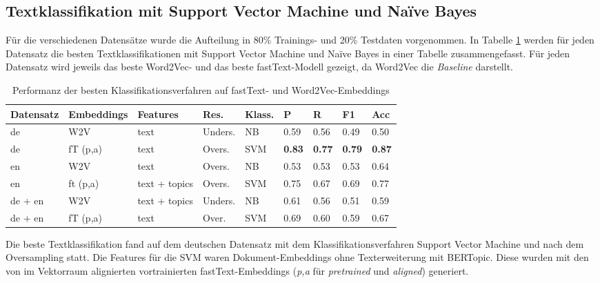\documentclass[ngerman]{ttlab-qualify}
\begin{document}
\subsection{Textklassifikation mit Support Vector Machine und Naïve Bayes}
Für die verschiedenen Datensätze wurde die Aufteilung in 80\% Trainings- und 20\% Testdaten vorgenommen. 
In Tabelle \ref{best_ML} werden für jeden Datensatz die besten Textklassifikationen mit Support Vector Machine und Naïve Bayes in einer Tabelle zusammengefasst. Für jeden Datensatz wird jeweils das beste Word2Vec- und das beste fastText-Modell gezeigt, da Word2Vec die \textit{Baseline} darstellt. 
\begin{table}[!ht]
    \centering
    \caption{Performanz der besten Klassifikationsverfahren auf fastText- und Word2Vec-Embeddings} \label{best_ML}
    \begin{tabular}{|l|l|l|l|l|l|l|l|l|}
    \hline
        \textbf{Datensatz} & \textbf{Embeddings} & \textbf{Features} & \textbf{Res.} & \textbf{Klass.} & \textbf{P} & \textbf{R} & \textbf{F1} & \textbf{Acc} \\ \hline
        de & W2V & text & Unders. & NB & 0.59 & 0.56 & 0.49 & 0.50 \\ \hline
        de & fT (p,a) & text & Overs. & SVM & \textbf{0.83} & \textbf{0.77} & \textbf{0.79} &\textbf{0.87} \\ \hline
        en & W2V & text & Overs. & NB & 0.53 & 0.53 & 0.53 & 0.64 \\ \hline
        en & ft (p,a) & text + topics & Overs. & SVM & 0.75 & 0.67 & 0.69 & 0.77 \\ \hline
        de + en & W2V & text + topics & Unders. & NB & 0.61 & 0.56 & 0.51 & 0.59 \\ \hline
        de + en & fT (p,a) & text & Over. & SVM & 0.69 & 0.60 & 0.59 & 0.67 \\ \hline
    \end{tabular}
\end{table}
\newpage \noindent Die beste Textklassifikation fand auf dem deutschen Datensatz mit dem Klassifikationsverfahren Support Vector Machine und nach dem Oversampling statt. Die Features für die SVM waren Dokument-Embeddings ohne Texterweiterung mit BERTopic. Diese wurden mit den von \textcite{conneau2017word} im Vektorraum alignierten vortrainierten fastText-Embeddings (\textit{p,a} für \textit{pretrained} und \textit{aligned}) generiert. 
\end{document}
